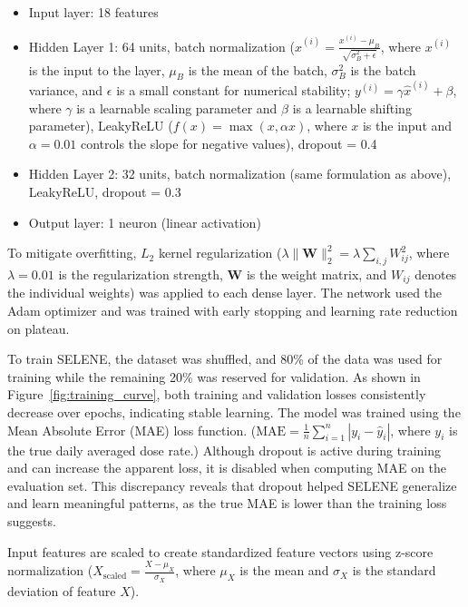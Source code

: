 \documentclass[conference]{IEEEtran}
\begin{document}
\begin{itemize}
    \item Input layer: 18 features
    
    \item Hidden Layer 1: 64 units, batch normalization ($\hat{x}^{(i)} = \frac{x^{(i)} - \mu_B}{\sqrt{\sigma_B^2 + \epsilon}}$, where $x^{(i)}$ is the input to the layer, $\mu_B$ is the mean of the batch, $\sigma_B^2$ is the batch variance, and $\epsilon$ is a small constant for numerical stability; 
    $y^{(i)} = \gamma \hat{x}^{(i)} + \beta$, where $\gamma$ is a learnable scaling parameter and $\beta$ is a learnable shifting parameter), LeakyReLU ($f(x) = \max(x, \alpha x)$, where $x$ is the input and $\alpha = 0.01$ controls the slope for negative values), dropout = 0.4
    
    \item Hidden Layer 2: 32 units, batch normalization (same formulation as above), LeakyReLU, dropout = 0.3
    
    \item Output layer: 1 neuron (linear activation)
\end{itemize}


To mitigate overfitting, $L_2$ kernel regularization ($\lambda \|\mathbf{W}\|_2^2 = \lambda \sum_{i,j} W_{ij}^2$, where $\lambda = 0.01$ is the regularization strength, $\mathbf{W}$ is the weight matrix, and $W_{ij}$ denotes the individual weights) was applied to each dense layer. The network used the Adam optimizer and was trained with early stopping and learning rate reduction on plateau.

To train SELENE, the dataset was shuffled, and 80\% of the data was used for training while the remaining 20\% was reserved for validation. As shown in Figure~\ref{fig:training_curve}, both training and validation losses consistently decrease over epochs, indicating stable learning. The model was trained using the Mean Absolute Error (MAE) loss function. (\( \text{MAE} = \frac{1}{n} \sum_{i=1}^{n} \left| y_i - \hat{y}_i \right| \), where \( y_i \) is the true daily averaged dose rate.) Although dropout is active during training and can increase the apparent loss, it is disabled when computing MAE on the evaluation set. This discrepancy reveals that dropout helped SELENE generalize and learn meaningful patterns, as the true MAE is lower than the training loss suggests.

Input features are scaled to create standardized feature vectors using z-score normalization (\( X_{\text{scaled}} = \frac{X - \mu_X}{\sigma_X} \), where \( \mu_X \) is the mean and \( \sigma_X \) is the standard deviation of feature \( X \)).
\end{document}
